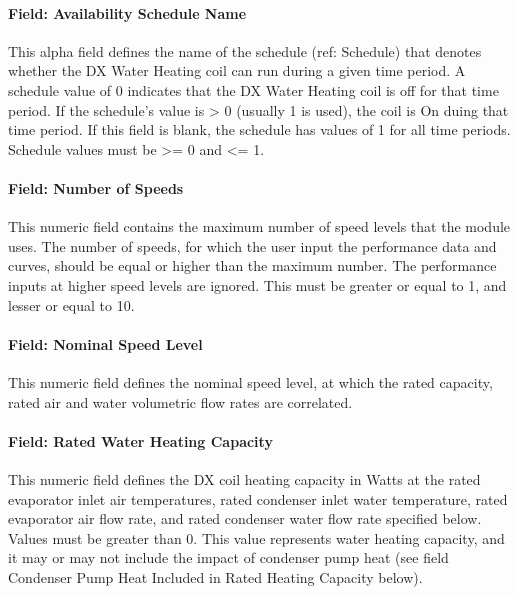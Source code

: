 \paragraph{Field: Availability Schedule Name}\label{field-availability-schedule-name-16-005}

This alpha field defines the name of the schedule (ref: Schedule) that denotes whether the DX Water Heating coil can run during a given time period. A schedule value of 0 indicates that the DX Water Heating coil is off for that time period. If the schedule's value is \textgreater{} 0 (usually 1 is used), the coil is On duing that time period. If this field is blank, the schedule has values of 1 for all time periods. Schedule values must be \textgreater{}= 0 and \textless{}= 1.

\paragraph{Field: Number of Speeds}\label{vshpwhheating-number-of-speeds}

This numeric field contains the maximum number of speed levels that the module uses.
The number of speeds, for which the user input the performance data and curves, should be equal or higher than the maximum number.
The performance inputs at higher speed levels are ignored. This must be greater or equal to 1, and lesser or equal to 10.


\paragraph{Field: Nominal Speed Level}\label{vshpwhheating-nominal-speed-level}

This numeric field defines the nominal speed level, at which the rated capacity, rated air and water volumetric flow rates are correlated.


\paragraph{Field: Rated Water Heating Capacity}\label{vshpwhheating-rated-water-heating-capacity}

This numeric field defines the DX coil heating capacity in Watts at the rated evaporator inlet air temperatures, rated condenser inlet water temperature,
rated evaporator air flow rate, and rated condenser water flow rate specified below.
Values must be greater than 0. This value represents water heating capacity, and it may or may not include the impact of condenser pump heat (see field Condenser Pump Heat Included in Rated Heating Capacity below).


